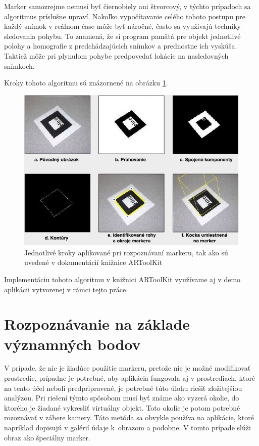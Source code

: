 Marker samozrejme nemusí byť čiernobiely ani štvorcový, v týchto prípadoch sa algoritmus príslušne upraví. Nakoľko vypočítavanie celého tohoto postupu pre každý snímok v reálnom čase môže byť náročné, často sa využívajú techniky sledovania pohybu. To znamená, že si program pamätá pre objekt jednotlivé polohy a homografie z predchádzajúcich snímkov a prednostne ich vyskúša. Taktiež môže pri plynulom pohybe predpovedať lokácie na nasledovných snímkoch.

Kroky tohoto algoritmu sú znázornené na obrázku \ref{artoolkit}.

\begin{figure}[h]
 \centering
 \includegraphics[max width=\textwidth]{pictures/artoolkit.png}
 \caption{Jednotlivé kroky aplikované pri rozpoznávaní markeru, tak ako sú uvedené v dokumentácií knižnice ARToolKit \cite{ARToolKit-a}}
 \label{artoolkit}
\end{figure}

Implementáciu tohoto algoritmu v knižnici ARToolKit využívame aj v demo aplikácii vytvorenej v rámci tejto práce.

\section{Rozpoznávanie na základe významných bodov}

V prípade, že nie je žiadúce použitie markeru, pretože nie je možné modifikovať prostredie, prípadne je potrebné, aby aplikácia fungovala aj v prostrediach, ktoré na tento účel neboli predpripravené, je potrebné túto úlohu riešiť zložitejšiou analýzou. Pri riešení týmto spôsobom musí byť známe ako vyzerá okolie, do ktorého je žiadané vykresliť virtuálny objekt. Toto okolie je potom potrebné rozoznávať v zábere kamery. Táto metóda sa obvykle používa na aplikácie, ktoré napríklad dopisujú v galérií údaje k~obrazom a podobne. V tomto prípade slúži obraz ako špeciálny marker.

